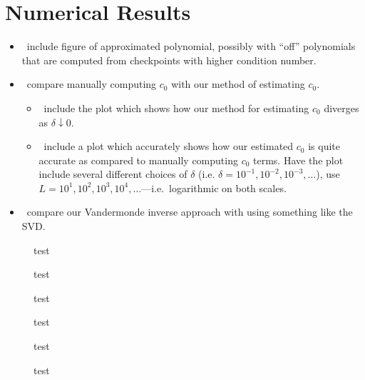 \section{Numerical Results}

\begin{itemize}
\item \TODO\ include figure of approximated polynomial, possibly with
  ``off'' polynomials that are computed from checkpoints with higher
  condition number.
\item \TODO\ compare manually computing $c_0$ with our method of
  estimating $c_0$.
  \begin{itemize}
  \item \TODO\ include the plot which shows how our method for
    estimating $c_0$ diverges as $\delta \downarrow 0$.
  \item \TODO\ include a plot which accurately shows how our estimated
    $c_0$ is quite accurate as compared to manually computing $c_0$
    terms. Have the plot include several different choices of $\delta$
    (i.e. $\delta = 10^{-1}, 10^{-2}, 10^{-3}, \hdots$), use
    $L = 10^1, 10^2, 10^3, 10^4, \hdots$---i.e.\ logarithmic on both
    scales.
  \end{itemize}
\item \TODO\ compare our Vandermonde inverse approach with using
  something like the SVD.\@
\end{itemize}

%   

\begin{figure}[h]
  \centering
  
  \caption{test}\label{fig:linf-error}
\end{figure}

\begin{figure}[h]
  \centering
  
  \caption{test}\label{fig:timings}
\end{figure}

\begin{figure}[h]
  \centering
  
  \caption{test}\label{fig:optL}
\end{figure}

\begin{figure}[h]
  \centering
  
  \caption{test}\label{fig:raddiff}
\end{figure}

\begin{figure}[h]
  \centering
  
  \caption{test}\label{fig:errorbound}
\end{figure}

\begin{figure}[h]
  \centering
  
  \caption{test}\label{fig:testfunc}
\end{figure}

